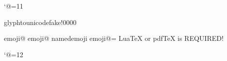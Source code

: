 

\catcode`@=11

\ifdefined\directlua
    
    \pdfextension glyphtounicode{fake!}{0000}
\fi

\ifdefined\pdftexversion
    \def\unemoji@print#1#2{%
        \ifcsname emoji@#2\endcsname%
            \pdfrefximage\csname emoji@#2\endcsname\relax%
        \else%
            \pdfximage named{emoji#2}{#1}%
            \expandafter\chardef\csname emoji@#2\endcsname=\pdflastximage\relax%
            \pdfrefximage\pdflastximage\relax%
        \fi%
    }
\fi

\ifx\unemoji@print\undefined
    \errmessage{%
        LuaTeX or pdfTeX is REQUIRED!%
    }
\fi

\def\emojifont{noto-emoji.pdf}

\def\emoji#1{%
    \unemoji@print{\emojifont}{#1}%
}

\catcode`@=12
\endinput
